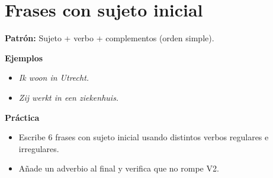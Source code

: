 \section{Frases con sujeto inicial}
\textbf{Patrón:} Sujeto + verbo + complementos (orden simple).

\textbf{Ejemplos}
\begin{itemize}[leftmargin=*]
  \item \textit{Ik woon in Utrecht.}
  \item \textit{Zij werkt in een ziekenhuis.}
\end{itemize}

\textbf{Práctica}
\begin{itemize}[leftmargin=*]
  \item Escribe 6 frases con sujeto inicial usando distintos verbos regulares e irregulares.
  \item Añade un adverbio al final y verifica que no rompe V2.
\end{itemize}
